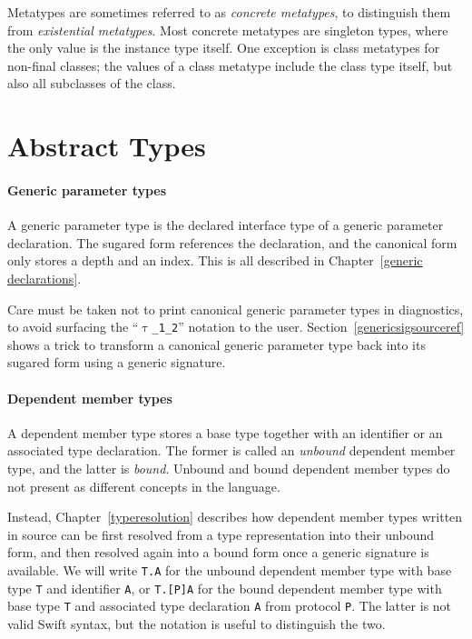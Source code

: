 \documentclass[a4paper,headsepline,bibliography=totoc,toc=flat,fleqn,twoside=semi]{scrbook}
\theoremstyle{definition}
\theoremstyle{definition}
\theoremstyle{definition}
\newcommand{\ttgp}[2]{\texttt{$\uptau$\_#1\_#2}}
\begin{document}
Metatypes are sometimes referred to as \emph{concrete metatypes}, to distinguish them from \emph{existential metatypes}. Most concrete metatypes are singleton types, where the only value is the instance type itself. One exception is class metatypes for non-final classes; the values of a class metatype include the class type itself, but also all subclasses of the class.

\section{Abstract Types}

\paragraph{Generic parameter types}
A generic parameter type is the declared interface type of a generic parameter declaration. The sugared form references the declaration, and the canonical form only stores a depth and an index. This is all described in Chapter~\ref{generic declarations}.

Care must be taken not to print canonical generic parameter types in diagnostics, to avoid surfacing the ``\ttgp{1}{2}'' notation to the user. Section~\ref{genericsigsourceref} shows a trick to transform a canonical generic parameter type back into its sugared form using a generic signature.

\paragraph{Dependent member types}
A dependent member type stores a base type together with an identifier or an associated type declaration. The former is called an \emph{unbound} dependent member type, and the latter is \emph{bound}. Unbound and bound dependent member types do not present as different concepts in the language.

Instead, Chapter~\ref{typeresolution} describes how dependent member types written in source can be first resolved from a type representation into their unbound form, and then resolved again into a bound form once a generic signature is available. We will write \texttt{T.A} for the unbound dependent member type with base type \texttt{T} and identifier \texttt{A}, or \texttt{T.[P]A} for the bound dependent member type with base type \texttt{T} and associated type declaration \texttt{A} from protocol \texttt{P}. The latter is not valid Swift syntax, but the notation is useful to distinguish the two.
\end{document}
